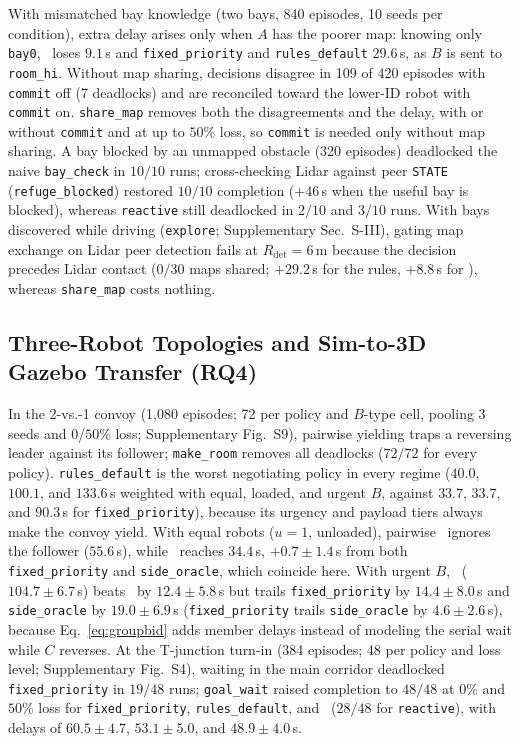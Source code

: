 With mismatched bay knowledge (two bays, 840 episodes, 10 seeds per condition), extra delay arises only when $A$ has the poorer map: knowing only \texttt{bay0}, \cb\ loses $9.1$\,s and \texttt{fixed\_priority} and \texttt{rules\_default} $29.6$\,s, as $B$ is sent to \texttt{room\_hi}. Without map sharing, decisions disagree in 109 of 420 episodes with \texttt{commit} off (7 deadlocks) and are reconciled toward the lower-ID robot with \texttt{commit} on. \texttt{share\_map} removes both the disagreements and the delay, with or without \texttt{commit} and at up to $50\%$ loss, so \texttt{commit} is needed only without map sharing. A bay blocked by an unmapped obstacle (320 episodes) deadlocked the naive \texttt{bay\_check} in $10/10$ runs; cross-checking Lidar against peer \texttt{STATE} (\texttt{refuge\_blocked}) restored $10/10$ completion ($+46$\,s when the useful bay is blocked), whereas \texttt{reactive} still deadlocked in $2/10$ and $3/10$ runs. With bays discovered while driving (\texttt{explore}; Supplementary Sec.~S-III), gating map exchange on Lidar peer detection fails at $R_{\mathrm{det}}=6$\,m because the decision precedes Lidar contact ($0/30$ maps shared; $+29.2$\,s for the rules, $+8.8$\,s for \cb), whereas \texttt{share\_map} costs nothing.

\subsection{Three-Robot Topologies and Sim-to-3D Gazebo Transfer (RQ4)}\label{sec:rq4}
In the 2-vs.-1 convoy (1,080 episodes; 72 per policy and $B$-type cell, pooling 3 seeds and $0$/$50\%$ loss; Supplementary Fig.~S9), pairwise yielding traps a reversing leader against its follower; \texttt{make\_room} removes all deadlocks ($72/72$ for every policy). \texttt{rules\_default} is the worst negotiating policy in every regime ($40.0$, $100.1$, and $133.6$\,s weighted with equal, loaded, and urgent $B$, against $33.7$, $33.7$, and $90.3$\,s for \texttt{fixed\_priority}), because its urgency and payload tiers always make the convoy yield. With equal robots ($u=1$, unloaded), pairwise \cb\ ignores the follower ($55.6$\,s), while \gb\ reaches $34.4$\,s, $+0.7\pm1.4$\,s from both \texttt{fixed\_priority} and \texttt{side\_oracle}, which coincide here. With urgent $B$, \gb\ ($104.7\pm6.7$\,s) beats \cb\ by $12.4\pm5.8$\,s but trails \texttt{fixed\_priority} by $14.4\pm8.0$\,s and \texttt{side\_oracle} by $19.0\pm6.9$\,s (\texttt{fixed\_priority} trails \texttt{side\_oracle} by $4.6\pm2.6$\,s), because Eq.~\eqref{eq:groupbid} adds member delays instead of modeling the serial wait while $C$ reverses. At the T-junction turn-in (384 episodes; 48 per policy and loss level; Supplementary Fig.~S4), waiting in the main corridor deadlocked \texttt{fixed\_priority} in $19/48$ runs; \texttt{goal\_wait} raised completion to $48/48$ at $0\%$ and $50\%$ loss for \texttt{fixed\_priority}, \texttt{rules\_default}, and \cb\ ($28/48$ for \texttt{reactive}), with delays of $60.5\pm4.7$, $53.1\pm5.0$, and $48.9\pm4.0$\,s.

